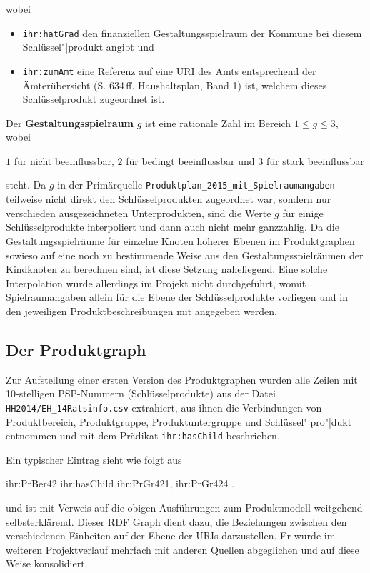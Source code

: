 \documentclass[a4paper,11pt,twoside]{article}
\begin{document}
wobei 
\begin{itemize}
\item \texttt{ihr:hatGrad} den finanziellen Gestaltungsspielraum der Kommune
  bei diesem Schlüssel"|produkt angibt und 
\item \texttt{ihr:zumAmt} eine Referenz auf eine URI des Amts entsprechend der
  Ämterübersicht  (S. 634\,ff. Haushaltsplan, Band 1) ist, welchem dieses
  Schlüsselprodukt zugeordnet ist. 
\end{itemize} 
Der \textbf{Gestaltungsspielraum} $g$ ist eine rationale Zahl im Bereich $1\le
g\le 3$, wobei
\begin{center}
  $1$ für nicht beeinflussbar, $2$ für bedingt beeinflussbar und $3$ für stark
  beeinflussbar 
\end{center}
steht. Da $g$ in der Primärquelle
\texttt{Produktplan\_2015\_mit\_Spielraumangaben} teilweise nicht direkt den
Schlüsselprodukten zugeordnet war, sondern nur verschieden ausgezeichneten
Unterprodukten, sind die Werte $g$ für einige Schlüsselprodukte interpoliert
und dann auch nicht mehr ganzzahlig.  Da die Gestaltungsspielräume für einzelne
Knoten höherer Ebenen im Produktgraphen sowieso auf eine noch zu bestimmende
Weise aus den Gestaltungsspielräumen der Kindknoten zu berechnen sind, ist
diese Setzung naheliegend.  Eine solche Interpolation wurde allerdings im
Projekt nicht durchgeführt, womit Spielraumangaben allein für die Ebene der
Schlüsselprodukte vorliegen und in den jeweiligen Produktbeschreibungen mit
angegeben werden. 

\subsection{Der Produktgraph}

Zur Aufstellung einer ersten Version des Produktgraphen wurden alle Zeilen mit
10-stelligen PSP-Nummern (Schlüsselprodukte) aus der Datei
\texttt{HH2014/EH\_14Ratsinfo.csv} extrahiert, aus ihnen die Verbindungen von
Produktbereich, Produktgruppe, Produktuntergruppe und Schlüssel"|pro"|dukt
entnommen und mit dem Prädikat \texttt{ihr:hasChild} beschrieben.

Ein typischer Eintrag sieht wie folgt aus
\begin{code}
  ihr:PrBer42 ihr:hasChild ihr:PrGr421, ihr:PrGr424 .
\end{code}

und ist mit Verweis auf die obigen Ausführungen zum Produktmodell weitgehend
selbsterklärend. Dieser RDF Graph dient dazu, die Beziehungen zwischen den
verschiedenen Einheiten auf der Ebene der URIs darzustellen.  Er wurde im
weiteren Projektverlauf mehrfach mit anderen Quellen abgeglichen und auf diese
Weise konsolidiert. 
\end{document}
